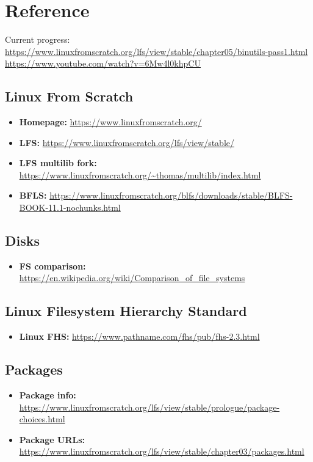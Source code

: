 \documentclass[10pt, a4paper, onecolumn, oneside, titlepage, openany]{book}
\begin{document}
\chapter{Reference}
Current progress:
\newline \url{https://www.linuxfromscratch.org/lfs/view/stable/chapter05/binutils-pass1.html}
\newline \url{https://www.youtube.com/watch?v=6Mw4l0khpCU}
\section{Linux From Scratch}
\begin{itemize}
    \item \textbf{Homepage:} \url{https://www.linuxfromscratch.org/}
    \item \textbf{LFS:} \url{https://www.linuxfromscratch.org/lfs/view/stable/}
    \item \textbf{LFS multilib fork:} \url{https://www.linuxfromscratch.org/~thomas/multilib/index.html}
    \item \textbf{BFLS:} \url{https://www.linuxfromscratch.org/blfs/downloads/stable/BLFS-BOOK-11.1-nochunks.html}
\end{itemize}

\section{Disks}
\begin{itemize}
    \item \textbf{FS comparison:} \url{https://en.wikipedia.org/wiki/Comparison_of_file_systems}
\end{itemize}

\section{Linux Filesystem Hierarchy Standard}
\begin{itemize}
    \item \textbf{Linux FHS:} \url{https://www.pathname.com/fhs/pub/fhs-2.3.html}
\end{itemize}

\section{Packages}
\begin{itemize}
    \item \textbf{Package info:} \url{https://www.linuxfromscratch.org/lfs/view/stable/prologue/package-choices.html}
    \item \textbf{Package URLs:} \url{https://www.linuxfromscratch.org/lfs/view/stable/chapter03/packages.html}
\end{itemize}
\end{document}
